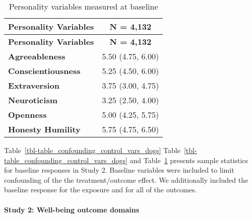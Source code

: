 \documentclass[
  singlecolumn,
  9pt]{article}
\let\oldparagraph\paragraph
\renewcommand{\paragraph}[1]{\oldparagraph{#1}\mbox{}}
\begin{document}
\hypertarget{tbl-table_baseline_personality_dogs}{}
\begin{longtable}[]{@{}lc@{}}
\caption{\label{tbl-table_baseline_personality_dogs}Personality
variables measured at baseline}\tabularnewline
\toprule\noalign{}
\textbf{Personality Variables} & \textbf{N = 4,132} \\
\midrule\noalign{}
\endfirsthead
\toprule\noalign{}
\textbf{Personality Variables} & \textbf{N = 4,132} \\
\midrule\noalign{}
\endhead
\bottomrule\noalign{}
\endlastfoot
\textbf{Agreeableness} & 5.50 (4.75, 6.00) \\
\textbf{Conscientiousness} & 5.25 (4.50, 6.00) \\
\textbf{Extraversion} & 3.75 (3.00, 4.75) \\
\textbf{Neuroticism} & 3.25 (2.50, 4.00) \\
\textbf{Openness} & 5.00 (4.25, 5.75) \\
\textbf{Honesty Humility} & 5.75 (4.75, 6.50) \\
\end{longtable}

Table~\ref{tbl-table_confounding_control_vars_dogs}
Table~\ref{tbl-table_confounding_control_vars_dogs} and
Table~\ref{tbl-table_baseline_personality_dogs} presents sample
statistics for baseline responses in Study 2. Baseline variables were
included to limit confounding of the the treatment/outcome effect. We
additionally included the baseline response for the exposure and for all
of the outcomes.

\paragraph{Study 2: Well-being outcome
domains}\label{study-2-well-being-outcome-domains}
\end{document}
